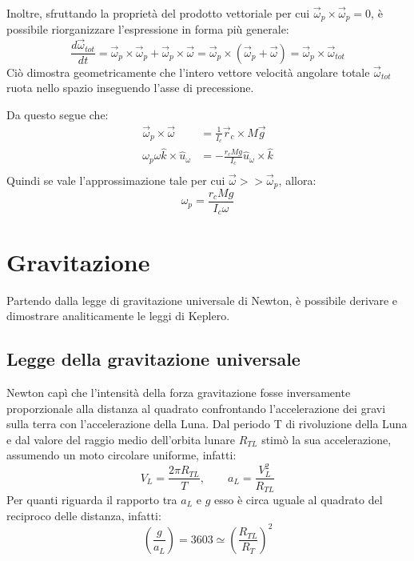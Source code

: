 \documentclass[11pt, a4paper, openright]{book}
\theoremstyle{plain}
\theoremstyle{definition}
\begin{document}
Inoltre, sfruttando la proprietà del prodotto vettoriale per cui $\vec{\omega}_p \times \vec{\omega}_p = 0$, è possibile riorganizzare l'espressione in forma più generale:
\begin{equation}
    \frac{d\vec{\omega}_{tot}}{dt} = \vec{\omega}_p \times \vec{\omega}_p + \vec{\omega}_p \times \vec{\omega} = \vec{\omega}_p \times (\vec{\omega}_p + \vec{\omega}) = \vec{\omega}_p \times \vec{\omega}_{tot}
\end{equation}
Ciò dimostra geometricamente che l'intero vettore velocità angolare totale $\vec{\omega}_{tot}$ ruota nello spazio inseguendo l'asse di precessione.

Da questo segue che:
\begin{align}
    \vec{\omega}_p \times \vec{\omega} & = \frac{1}{I_c} \vec{r}_c \times M\vec{g} \\
    \omega_p \omega \hat{k} \times \hat{u}_\omega  & = -\frac{r_cMg}{I_c} \hat{u}_\omega \times \hat{k} \\
\end{align}
Quindi se vale l'approssimazione tale per cui $\vec{\omega} >> \vec{\omega}_p$, allora:
\begin{equation}
    \omega_p = \frac{r_cMg}{I_c \omega}
\end{equation}


\chapter{Gravitazione}
Partendo dalla legge di gravitazione universale di Newton, è possibile derivare e dimostrare analiticamente le leggi di Keplero.

\section{Legge della gravitazione universale}
Newton capì che l'intensità della forza gravitazione fosse inversamente proporzionale alla distanza al quadrato confrontando l'accelerazione dei gravi sulla terra con l'accelerazione della Luna. Dal periodo T di rivoluzione della Luna e dal valore del raggio medio dell'orbita lunare $R_{TL}$ stimò la sua accelerazione, assumendo un moto circolare uniforme, infatti:
\begin{equation}
    V_L = \frac{2\pi R_{TL}}{T}, \quad \quad a_L = \frac{V_L^2}{R_{TL}}
\end{equation}
Per quanti riguarda il rapporto tra $a_L$ e $g$ esso è circa uguale al quadrato del reciproco delle distanza, infatti:
\begin{equation}
    (\frac{g}{a_L}) = 3603 \simeq (\frac{R_{TL}}{R_T})^2
\end{equation}
\end{document}
